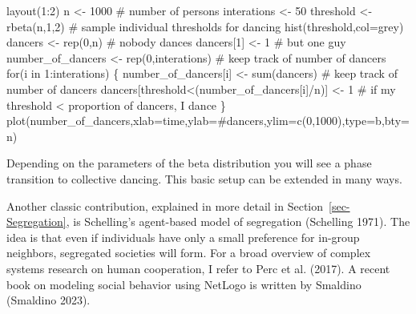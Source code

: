 \documentclass[
  a4paper,
  DIV=11,
  numbers=noendperiod]{scrreprt}
\newenvironment{Shaded}{\begin{snugshade}}{\end{snugshade}}
\newcommand{\AttributeTok}[1]{\textcolor[rgb]{0.40,0.45,0.13}{#1}}
\newcommand{\CommentTok}[1]{\textcolor[rgb]{0.37,0.37,0.37}{#1}}
\newcommand{\ControlFlowTok}[1]{\textcolor[rgb]{0.00,0.23,0.31}{#1}}
\newcommand{\DecValTok}[1]{\textcolor[rgb]{0.68,0.00,0.00}{#1}}
\newcommand{\FunctionTok}[1]{\textcolor[rgb]{0.28,0.35,0.67}{#1}}
\newcommand{\NormalTok}[1]{\textcolor[rgb]{0.00,0.23,0.31}{#1}}
\newcommand{\OtherTok}[1]{\textcolor[rgb]{0.00,0.23,0.31}{#1}}
\newcommand{\SpecialCharTok}[1]{\textcolor[rgb]{0.37,0.37,0.37}{#1}}
\newcommand{\StringTok}[1]{\textcolor[rgb]{0.13,0.47,0.30}{#1}}
\begin{document}
\begin{Shaded}
\begin{Highlighting}[]
\FunctionTok{layout}\NormalTok{(}\DecValTok{1}\SpecialCharTok{:}\DecValTok{2}\NormalTok{)}
\NormalTok{n }\OtherTok{\textless{}{-}} \DecValTok{1000} \CommentTok{\# number of persons}
\NormalTok{interations }\OtherTok{\textless{}{-}} \DecValTok{50}
\NormalTok{threshold }\OtherTok{\textless{}{-}} \FunctionTok{rbeta}\NormalTok{(n,}\DecValTok{1}\NormalTok{,}\DecValTok{2}\NormalTok{) }\CommentTok{\# sample individual thresholds for dancing}
\FunctionTok{hist}\NormalTok{(threshold,}\AttributeTok{col=}\StringTok{\textquotesingle{}grey\textquotesingle{}}\NormalTok{)}
\NormalTok{dancers }\OtherTok{\textless{}{-}} \FunctionTok{rep}\NormalTok{(}\DecValTok{0}\NormalTok{,n) }\CommentTok{\# nobody dances}
\NormalTok{dancers[}\DecValTok{1}\NormalTok{] }\OtherTok{\textless{}{-}} \DecValTok{1} \CommentTok{\# but one guy}
\NormalTok{number\_of\_dancers }\OtherTok{\textless{}{-}} \FunctionTok{rep}\NormalTok{(}\DecValTok{0}\NormalTok{,interations) }\CommentTok{\# keep track of number of dancers}
\ControlFlowTok{for}\NormalTok{(i }\ControlFlowTok{in} \DecValTok{1}\SpecialCharTok{:}\NormalTok{interations)}
\NormalTok{\{}
\NormalTok{  number\_of\_dancers[i] }\OtherTok{\textless{}{-}} \FunctionTok{sum}\NormalTok{(dancers) }\CommentTok{\# keep track of number of dancers}
\NormalTok{  dancers[threshold}\SpecialCharTok{\textless{}}\NormalTok{(number\_of\_dancers[i]}\SpecialCharTok{/}\NormalTok{n)] }\OtherTok{\textless{}{-}} \DecValTok{1} 
\CommentTok{\# if my threshold \textless{} proportion of dancers, I dance}
\NormalTok{\}}
\FunctionTok{plot}\NormalTok{(number\_of\_dancers,}\AttributeTok{xlab=}\StringTok{\textquotesingle{}time\textquotesingle{}}\NormalTok{,}\AttributeTok{ylab=}\StringTok{\textquotesingle{}\#dancers\textquotesingle{}}\NormalTok{,}\AttributeTok{ylim=}\FunctionTok{c}\NormalTok{(}\DecValTok{0}\NormalTok{,}\DecValTok{1000}\NormalTok{),}\AttributeTok{type=}\StringTok{\textquotesingle{}b\textquotesingle{}}\NormalTok{,}\AttributeTok{bty=}\StringTok{\textquotesingle{}n\textquotesingle{}}\NormalTok{)}
\end{Highlighting}
\end{Shaded}

Depending on the parameters of the beta distribution you will see a
phase transition to collective dancing. This basic setup can be extended
in many ways.

Another classic contribution, explained in more detail in
Section~\ref{sec-Segregation}, is Schelling's agent-based model of
segregation (Schelling 1971). The idea is that even if individuals have
only a small preference for in-group neighbors, segregated societies
will form. For a broad overview of complex systems research on human
cooperation, I refer to Perc et al. (2017). A recent book on modeling
social behavior using NetLogo is written by Smaldino (Smaldino 2023).
\end{document}

